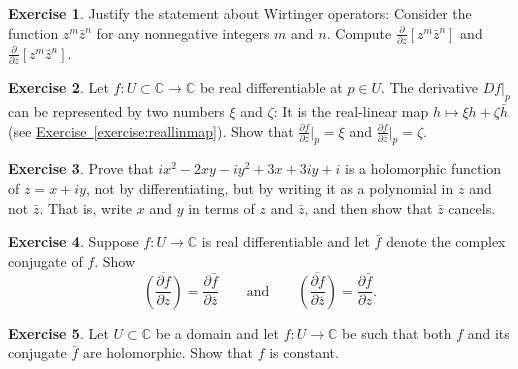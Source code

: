 \documentclass[12pt,openany]{book}
\newcommand{\C}{{\mathbb{C}}}
\theoremstyle{plain}
\theoremstyle{remark}
\theoremstyle{definition}
\newenvironment{exbox}{%
    \def\FrameCommand{\vrule width 1pt \relax\hspace{10pt}}%
    \MakeFramed{\advance\hsize-\width\FrameRestore}%
}{%
    \endMakeFramed
}
\theoremstyle{exercise}
\newtheorem{exercise}{Exercise}[section]
\theoremstyle{example}
\newcommand{\exerciseref}[1]{\hyperref[#1]{Exercise~\ref*{#1}}}
\begin{document}
\begin{exbox}
\begin{exercise}
Justify the statement about Wirtinger operators:  Consider
the function $z^m\bar{z}^n$ for any nonnegative integers $m$ and $n$.
Compute
$\frac{\partial}{\partial z} \left[ z^m\bar{z}^n \right]$
and
$\frac{\partial}{\partial \bar{z}} \left[ z^m\bar{z}^n \right]$.
\end{exercise}

\begin{exercise}
Let $f \colon U \subset \C \to \C$ be real differentiable at $p \in U$.
The derivative $Df|_{p}$ can be represented by two numbers $\xi$ and
$\zeta$: It is the real-linear map $h \mapsto \xi h + \zeta \bar{h}$
(see \exerciseref{exercise:reallinmap}).
Show that $\frac{\partial f}{\partial z} \big|_p = \xi$ and
$\frac{\partial f}{\partial \bar{z}} \big|_p = \zeta$.
\end{exercise}

\begin{exercise}
Prove that $ix^2 - 2xy -iy^2 + 3x + 3iy + i$ is a holomorphic function of
$z = x+iy$, not by
differentiating, but by writing it as a polynomial in $z$ and not $\bar{z}$.
That is, write $x$ and $y$ in terms of $z$ and $\bar{z}$, and then show
that $\bar{z}$ cancels.
\end{exercise}

\begin{exercise}%
\label{exercise:wirtingerandbar}
Suppose $f \colon U \to \C$ is real differentiable and let $\bar{f}$
denote the complex conjugate of $f$.  Show
\begin{equation*}
\overline{\left(\frac{\partial f}{\partial z}\right)} = 
\frac{\partial \bar{f}}{\partial \bar{z}}
\qquad \text{and} \qquad
\overline{\left(\frac{\partial f}{\partial \bar{z}}\right)} = 
\frac{\partial \bar{f}}{\partial z} .
\end{equation*}
\end{exercise}

\begin{exercise}
Let $U \subset \C$ be a domain and
let $f \colon U \to \C$ be such that both $f$ and its conjugate
$\bar{f}$ are holomorphic.  Show that $f$ is constant.
\end{exercise}


\end{exbox}
\end{document}
